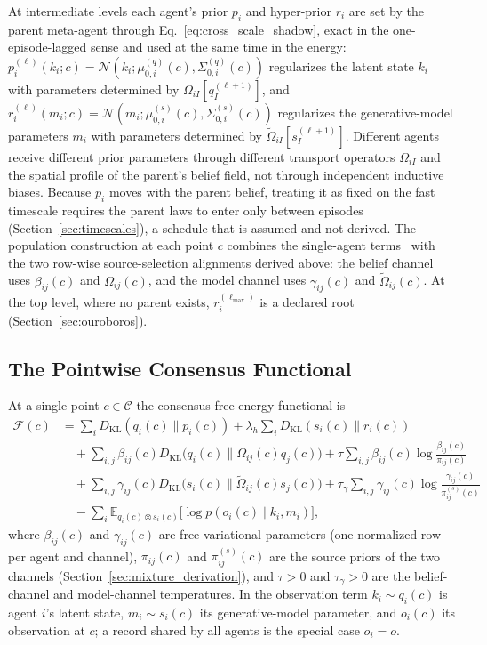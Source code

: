 At intermediate levels each agent's prior $p_i$ and hyper-prior $r_i$ are set by the parent meta-agent through Eq.~\eqref{eq:cross_scale_shadow}, exact in the one-episode-lagged sense and used at the same time in the energy: $p_i^{(\ell)}(k_i; c) = \mathcal{N}(k_i; \mu_{0,i}^{(q)}(c), \Sigma_{0,i}^{(q)}(c))$ regularizes the latent state $k_i$ with parameters determined by $\Omega_{iI}[q_I^{(\ell+1)}]$, and $r_i^{(\ell)}(m_i; c) = \mathcal{N}(m_i; \mu_{0,i}^{(s)}(c), \Sigma_{0,i}^{(s)}(c))$ regularizes the generative-model parameters $m_i$ with parameters determined by $\tilde\Omega_{iI}[s_I^{(\ell+1)}]$. Different agents receive different prior parameters through different transport operators $\Omega_{iI}$ and the spatial profile of the parent's belief field, not through independent inductive biases. Because $p_i$ moves with the parent belief, treating it as fixed on the fast timescale requires the parent laws to enter only between episodes (Section~\ref{sec:timescales}), a schedule that is assumed and not derived. The population construction at each point $c$ combines the single-agent terms~\cite{Friston2010, parr2022active} with the two row-wise source-selection alignments derived above: the belief channel uses $\beta_{ij}(c)$ and $\Omega_{ij}(c)$, and the model channel uses $\gamma_{ij}(c)$ and $\tilde{\Omega}_{ij}(c)$. At the top level, where no parent exists, $r_i^{(\ell_{\max})}$ is a declared root (Section~\ref{sec:ouroboros}).

\subsection{The Pointwise Consensus Functional}

At a single point $c \in \mathcal{C}$ the consensus free-energy functional is
\begin{equation}
\begin{aligned}
\mathcal{F}(c) &= \sum_i D_{\mathrm{KL}}(q_i(c) \| p_i(c)) + \lambda_h \sum_i D_{\mathrm{KL}}(s_i(c) \| r_i(c)) \\
&\quad + \sum_{i,j} \beta_{ij}(c) D_{\mathrm{KL}}\big(q_i(c) \big\| \Omega_{ij}(c)q_j(c)\big) + \tau \sum_{i,j} \beta_{ij}(c) \log\frac{\beta_{ij}(c)}{\pi_{ij}(c)} \\
&\quad + \sum_{i,j} \gamma_{ij}(c) D_{\mathrm{KL}}\big(s_i(c) \big\| \tilde{\Omega}_{ij}(c)s_j(c)\big) + \tau_\gamma \sum_{i,j} \gamma_{ij}(c) \log\frac{\gamma_{ij}(c)}{\pi^{(s)}_{ij}(c)} \\
&\quad - \sum_i \mathbb{E}_{q_i(c) \otimes s_i(c)}\big[\log p(o_i(c) \mid k_i, m_i)\big],
\end{aligned}
\label{eq:pointwise_free_energy}
\end{equation}
where $\beta_{ij}(c)$ and $\gamma_{ij}(c)$ are free variational parameters (one normalized row per agent and channel), $\pi_{ij}(c)$ and $\pi^{(s)}_{ij}(c)$ are the source priors of the two channels (Section~\ref{sec:mixture_derivation}), and $\tau > 0$ and $\tau_\gamma > 0$ are the belief-channel and model-channel temperatures. In the observation term $k_i \sim q_i(c)$ is agent $i$'s latent state, $m_i \sim s_i(c)$ its generative-model parameter, and $o_i(c)$ its observation at $c$; a record shared by all agents is the special case $o_i = o$.

